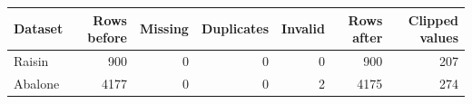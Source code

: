 \begin{tabular}{lrrrrrr}
\toprule
Dataset & Rows before & Missing & Duplicates & Invalid & Rows after & Clipped values \\
\midrule
Raisin & 900 & 0 & 0 & 0 & 900 & 207 \\
Abalone & 4177 & 0 & 0 & 2 & 4175 & 274 \\
\bottomrule
\end{tabular}

